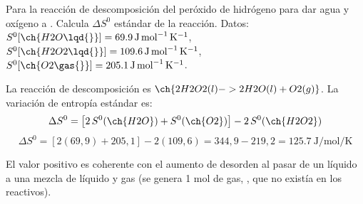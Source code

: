\begin{exercise}
    Para la reacción de descomposición del peróxido de hidrógeno para dar agua y oxígeno a . Calcula \(\Delta S^0\) estándar de la reacción. Datos: \(S^0 [\ch{H2O \lqd{}}] = \SI{69.9}{\joule\per\mole\per\kelvin}\), \(S^0 [\ch{H2O2 \lqd{}}] = \SI{109.6}{\joule\per\mole\per\kelvin}\), \(S^0 [\ch{O2 \gas{}}] = \SI{205.1}{\joule\per\mole\per\kelvin}\).


    \begin{solu}


        La reacción de descomposición es \(\ch{2 H2O2 (l) -> 2 H2O (l) + O2 (g)}\). La variación de entropía estándar es:
        \[
            \Delta S^0 = \left[2\,S^0(\ch{H2O}) + S^0(\ch{O2})\right] - 2\,S^0(\ch{H2O2})
        \]
        \[
            \Delta S^0 = \left[2(69{,}9)+205{,}1\right] - 2(109{,}6) = 344{,}9-219{,}2 = \SI{125,7}{\joule\per\mole\per\kelvin}
        \]

        El valor positivo es coherente con el aumento de desorden al pasar de un líquido a una mezcla de líquido y gas (se genera 1 mol de gas, , que no existía en los reactivos).
    \end{solu}
\end{exercise}

